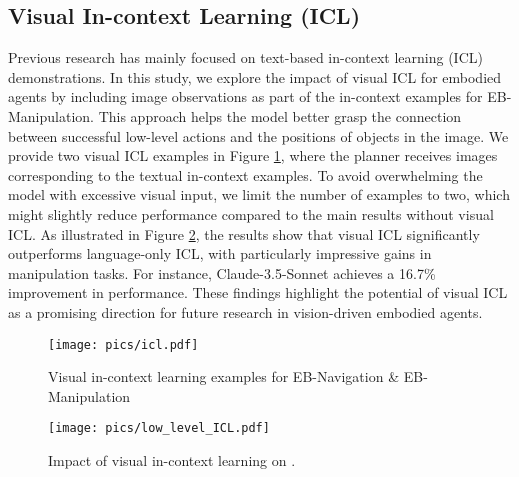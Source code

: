 \subsection{Visual In-context Learning (ICL)}\label{ap:visual_icl}


Previous research has mainly focused on text-based in-context learning (ICL) demonstrations. In this study, we explore the impact of visual ICL for embodied agents by including image observations as part of the in-context examples for EB-Manipulation. This approach helps the model better grasp the connection between successful low-level actions and the positions of objects in the image. We provide two visual ICL examples in Figure \ref{fig:visual_icl_examples}, where the planner receives images corresponding to the textual in-context examples. To avoid overwhelming the model with excessive visual input, we limit the number of examples to two, which might slightly reduce performance compared to the main results without visual ICL.
As illustrated in Figure \ref{fig:in_context_learning}, the results show that visual ICL significantly outperforms language-only ICL, with particularly impressive gains in manipulation tasks. For instance, Claude-3.5-Sonnet achieves a 16.7\% improvement in performance. These findings highlight the potential of visual ICL as a promising direction for future research in vision-driven embodied agents.

\begin{figure}[h!]
\begin{center}
\texttt{[image: pics/icl.pdf]}
\end{center}
\vspace{-1em}
\caption{Visual in-context learning examples for EB-Navigation \& EB-Manipulation}
\label{fig:visual_icl_examples}
\end{figure}

\begin{figure}[h!]
\begin{center}
\texttt{[image: pics/low\_level\_ICL.pdf]}
\end{center}
\vspace{-1.5em}
\caption{Impact of visual in-context learning on \name.}
\label{fig:in_context_learning}
\end{figure}


